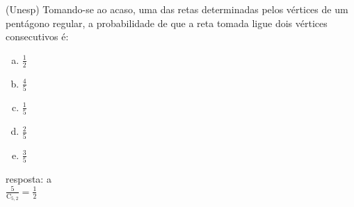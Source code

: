 \begin{ex}
 (Unesp) Tomando-se ao acaso, uma das retas determinadas pelos vértices de um pentágono regular, a probabilidade de que a reta tomada ligue dois vértices consecutivos é:
    \begin{enumerate}[(a)]
    \item $\frac{1}{2}$
    \item $\frac{4}{5}$
    \item $\frac{1}{5}$
    \item $\frac{2}{5}$
    \item $\frac{3}{5}$
    \end{enumerate}
      \begin{sol}
       resposta: a \\
       $\frac{5}{\mathrm{C}_{5,2}}=\frac{1}{2}$
      \end{sol}
\end{ex}